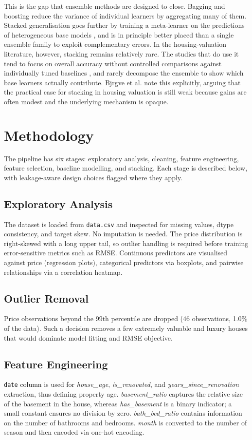 \documentclass[conference]{IEEEtran}
\begin{document}
This is the gap that ensemble methods are designed to close. Bagging and boosting reduce the variance of individual learners by aggregating many of them\cite{10.1023/A:1010933404324,hjort2022house}. Stacked generalisation goes further by training a meta-learner on the predictions of heterogeneous base models \cite{WOLPERT1992241}, and is in principle better placed than a single ensemble family to exploit complementary errors. In the housing-valuation literature, however, stacking remains relatively rare. The studies that do use it tend to focus on overall accuracy without controlled comparisons against individually tuned baselines \cite{land13091436,10937620}, and rarely decompose the ensemble to show which base learners actually contribute. Bjrgve et al. \cite{Bjrgve2025ComparingHV} note this explicitly, arguing that the practical case for stacking in housing valuation is still weak because gains are often modest and the underlying mechanism is opaque.


\section{Methodology}
The pipeline has six stages: exploratory analysis, cleaning, feature engineering, feature selection, baseline modelling, and stacking. Each stage is described below, with leakage-aware design choices flagged where they apply.

\subsection{Exploratory Analysis}
The dataset is loaded from \texttt{data.csv} and inspected for missing values, dtype consistency, and target skew. No imputation is needed. The price distribution is right-skewed with a long upper tail, so outlier handling is required before training error-sensitive metrics such as RMSE. Continuous predictors are visualised against price (regression plots), categorical predictors via boxplots, and pairwise relationships via a correlation heatmap.

\subsection{Outlier Removal}
Price observations beyond the 99th percentile are dropped (46 observations, 1.0\% of the data). Such a decision removes a few extremely valuable and luxury houses that would dominate model fitting and RMSE objective.

\subsection{Feature Engineering}
\texttt{date} column is used for \textit{house\_age}, \textit{is\_renovated}, and \textit{years\_since\_renovation} extraction, thus defining property age. \textit{basement\_ratio} captures the relative size of the basement in the house, whereas \textit{has\_basement} is a binary indicator; a small constant ensures no division by zero. \textit{bath\_bed\_ratio} contains information on the number of bathrooms and bedrooms. \textit{month} is converted to the number of season and then encoded via one-hot encoding.
\end{document}
